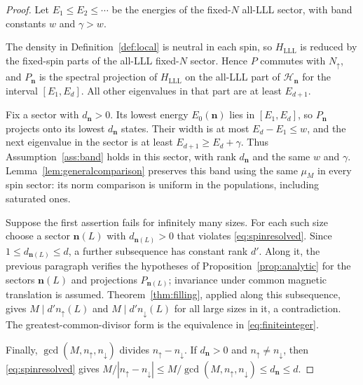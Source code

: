 \documentclass[11pt]{article}
\theoremstyle{definition}
\theoremstyle{remark}
\newcommand{\HH}{\mathcal H}
\newcommand{\up}{\uparrow}
\newcommand{\dn}{\downarrow}
\newcommand{\abs}[1]{\left|#1\right|}
\begin{document}
\begin{proof}
Let \(E_1\le E_2\le\cdots\) be the energies of the fixed-\(N\)
all-LLL sector, with band constants \(w\) and \(\gamma>w\).

The density in Definition~\ref{def:local} is neutral in each spin, so
\(H_{\mathrm{LLL}}\) is reduced by the fixed-spin parts of the
all-LLL fixed-\(N\) sector.  Hence \(P\) commutes with \(N_\up\),
and \(P_{\bm n}\) is the spectral projection of
\(H_{\mathrm{LLL}}\) on the all-LLL part of \(\HH_{\bm n}\) for the
interval \([E_1,E_d]\).  All other eigenvalues in that part are at
least \(E_{d+1}\).

Fix a sector with \(d_{\bm n}>0\).  Its lowest energy
\(E_0(\bm n)\) lies in \([E_1,E_d]\), so \(P_{\bm n}\) projects onto
its lowest \(d_{\bm n}\) states.  Their width is at most
\(E_d-E_1\le w\), and the next eigenvalue in the sector is at least
\(E_{d+1}\ge E_d+\gamma\).  Thus Assumption~\ref{ass:band} holds in
this sector, with rank \(d_{\bm n}\) and the same \(w\) and
\(\gamma\).  Lemma~\ref{lem:generalcomparison} preserves this band
using the same \(\mu_M\) in every spin sector: its norm comparison
is uniform in the populations, including saturated ones.

Suppose the first assertion fails for infinitely many sizes.  For
each such size choose a sector \(\bm n(L)\) with
\(d_{\bm n(L)}>0\) that violates \eqref{eq:spinresolved}.  Since
\(1\le d_{\bm n(L)}\le d\), a further subsequence has constant rank
\(d'\).  Along it, the previous paragraph verifies the hypotheses of
Proposition~\ref{prop:analytic} for the sectors \(\bm n(L)\) and projections
\(P_{\bm n(L)}\); invariance under common magnetic translation is
assumed.  Theorem~\ref{thm:filling}, applied along this subsequence,
gives \(M\mid d'n_\up(L)\) and \(M\mid d'n_\dn(L)\) for all large
sizes in it, a contradiction.  The greatest-common-divisor form is
the equivalence in \eqref{eq:finiteinteger}.

Finally, \(\gcd(M,n_\up,n_\dn)\) divides \(n_\up-n_\dn\).  If
\(d_{\bm n}>0\) and \(n_\up\ne n_\dn\), then \eqref{eq:spinresolved}
gives
\(M/\abs{n_\up-n_\dn}\le M/\gcd(M,n_\up,n_\dn)\le d_{\bm n}\le d\).
\end{proof}
\end{document}
